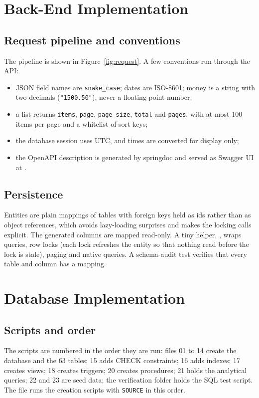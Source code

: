 \section{Back-End Implementation}
\subsection{Request pipeline and conventions}
The pipeline is shown in Figure~\ref{fig:request}. A few conventions run through the API:
\begin{itemize}
\item JSON field names are \texttt{snake\_case}; dates are ISO-8601; money is a string with two decimals (\texttt{"1500.50"}), never a floating-point number;
\item a list returns \texttt{items}, \texttt{page}, \texttt{page\_size}, \texttt{total} and \texttt{pages}, with at most 100 items per page and a whitelist of sort keys;
\item the database session uses UTC, and times are converted for display only;
\item the OpenAPI description is generated by springdoc and served as Swagger UI at .
\end{itemize}

\subsection{Persistence}
Entities are plain mappings of tables with foreign keys held as ids rather than as object
references, which avoids lazy-loading surprises and makes the locking calls explicit. The
generated columns are mapped read-only. A tiny helper, , wraps queries, row locks
(each lock refreshes the entity so that nothing read before the lock is stale), paging and
native queries. A schema-audit test verifies that every table and column has a mapping.

\section{Database Implementation}
\subsection{Scripts and order}
The scripts are numbered in the order they are run: files 01 to 14 create the database and
the 63 tables; 15 adds CHECK constraints; 16 adds indexes; 17 creates views; 18 creates
triggers; 20 creates procedures; 21 holds the analytical queries; 22 and 23 are seed data;
the verification folder holds the SQL test script. The file  runs the
creation scripts with \texttt{SOURCE} in this order.

